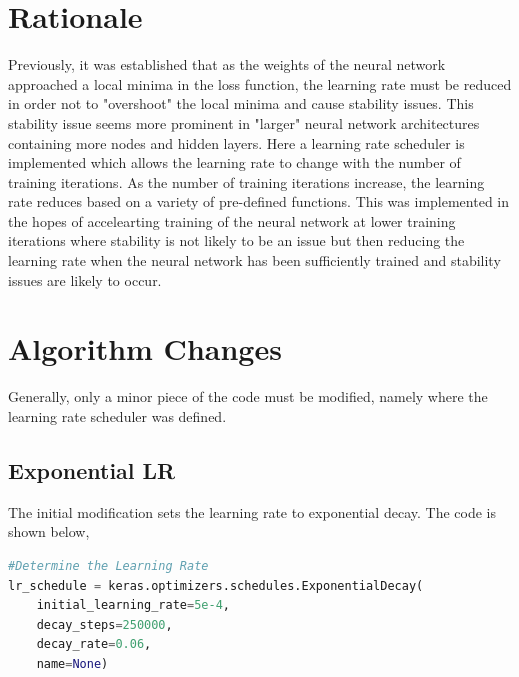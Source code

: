 \documentclass[a4paper, 12pt]{report}
\begin{document}
\begin{center}

\section{Rationale}

Previously, it was established that as the weights of the neural network approached a local minima in the loss function, the learning rate must be reduced in order not to "overshoot" the local minima and cause stability issues. This stability issue seems more prominent in "larger" neural network architectures containing more nodes and hidden layers. Here a learning rate scheduler is implemented which allows the learning rate to change with the number of training iterations. As the number of training iterations increase, the learning rate reduces based on a variety of pre-defined functions. This was implemented in the hopes of accelearting training of the neural network at lower training iterations where stability is not likely to be an issue but then reducing the learning rate when the neural network has been sufficiently trained and stability issues are likely to occur. 
\section{Algorithm Changes}

Generally, only a minor piece of the code must be modified, namely where the learning rate scheduler was defined.
\subsection{Exponential LR}

The initial modification sets the learning rate to exponential decay. The code is shown below,
\begin{lstlisting}[language=python]
#Determine the Learning Rate
lr_schedule = keras.optimizers.schedules.ExponentialDecay(
    initial_learning_rate=5e-4,
    decay_steps=250000,
    decay_rate=0.06,
    name=None)
\end{lstlisting}

\end{center}
\end{document}
